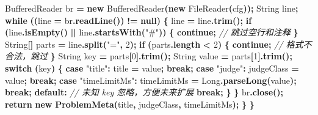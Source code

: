 \documentclass[
  11pt,
]{ctexart}
\newenvironment{Shaded}{\begin{snugshade}}{\end{snugshade}}
\newcommand{\BuiltInTok}[1]{#1}
\newcommand{\CommentTok}[1]{\textcolor[rgb]{0.56,0.35,0.01}{\textit{#1}}}
\newcommand{\ControlFlowTok}[1]{\textcolor[rgb]{0.13,0.29,0.53}{\textbf{#1}}}
\newcommand{\DecValTok}[1]{\textcolor[rgb]{0.00,0.00,0.81}{#1}}
\newcommand{\FunctionTok}[1]{\textcolor[rgb]{0.13,0.29,0.53}{\textbf{#1}}}
\newcommand{\KeywordTok}[1]{\textcolor[rgb]{0.13,0.29,0.53}{\textbf{#1}}}
\newcommand{\NormalTok}[1]{#1}
\newcommand{\OperatorTok}[1]{\textcolor[rgb]{0.81,0.36,0.00}{\textbf{#1}}}
\newcommand{\StringTok}[1]{\textcolor[rgb]{0.31,0.60,0.02}{#1}}
\begin{document}
\begin{Shaded}
\begin{Highlighting}[]
        \BuiltInTok{BufferedReader}\NormalTok{ br }\OperatorTok{=} \KeywordTok{new} \BuiltInTok{BufferedReader}\OperatorTok{(}\KeywordTok{new} \BuiltInTok{FileReader}\OperatorTok{(}\NormalTok{cfg}\OperatorTok{));}
        \BuiltInTok{String}\NormalTok{ line}\OperatorTok{;}
        \ControlFlowTok{while} \OperatorTok{((}\NormalTok{line }\OperatorTok{=}\NormalTok{ br}\OperatorTok{.}\FunctionTok{readLine}\OperatorTok{())} \OperatorTok{!=} \KeywordTok{null}\OperatorTok{)} \OperatorTok{\{}
\NormalTok{            line }\OperatorTok{=}\NormalTok{ line}\OperatorTok{.}\FunctionTok{trim}\OperatorTok{();}
            \ControlFlowTok{if} \OperatorTok{(}\NormalTok{line}\OperatorTok{.}\FunctionTok{isEmpty}\OperatorTok{()} \OperatorTok{||}\NormalTok{ line}\OperatorTok{.}\FunctionTok{startsWith}\OperatorTok{(}\StringTok{"\#"}\OperatorTok{))} \OperatorTok{\{}
                \ControlFlowTok{continue}\OperatorTok{;}   \CommentTok{// 跳过空行和注释}
            \OperatorTok{\}}
            \BuiltInTok{String}\OperatorTok{[]}\NormalTok{ parts }\OperatorTok{=}\NormalTok{ line}\OperatorTok{.}\FunctionTok{split}\OperatorTok{(}\StringTok{"="}\OperatorTok{,} \DecValTok{2}\OperatorTok{);}
            \ControlFlowTok{if} \OperatorTok{(}\NormalTok{parts}\OperatorTok{.}\FunctionTok{length} \OperatorTok{\textless{}} \DecValTok{2}\OperatorTok{)} \OperatorTok{\{}
                \ControlFlowTok{continue}\OperatorTok{;}   \CommentTok{// 格式不合法，跳过}
            \OperatorTok{\}}
            \BuiltInTok{String}\NormalTok{ key   }\OperatorTok{=}\NormalTok{ parts}\OperatorTok{[}\DecValTok{0}\OperatorTok{].}\FunctionTok{trim}\OperatorTok{();}
            \BuiltInTok{String}\NormalTok{ value }\OperatorTok{=}\NormalTok{ parts}\OperatorTok{[}\DecValTok{1}\OperatorTok{].}\FunctionTok{trim}\OperatorTok{();}
            \ControlFlowTok{switch} \OperatorTok{(}\NormalTok{key}\OperatorTok{)} \OperatorTok{\{}
                \ControlFlowTok{case} \StringTok{"title"}\OperatorTok{:}
\NormalTok{                    title }\OperatorTok{=}\NormalTok{ value}\OperatorTok{;}
                    \ControlFlowTok{break}\OperatorTok{;}
                \ControlFlowTok{case} \StringTok{"judge"}\OperatorTok{:}
\NormalTok{                    judgeClass }\OperatorTok{=}\NormalTok{ value}\OperatorTok{;}
                    \ControlFlowTok{break}\OperatorTok{;}
                \ControlFlowTok{case} \StringTok{"timeLimitMs"}\OperatorTok{:}
\NormalTok{                    timeLimitMs }\OperatorTok{=} \BuiltInTok{Long}\OperatorTok{.}\FunctionTok{parseLong}\OperatorTok{(}\NormalTok{value}\OperatorTok{);}
                    \ControlFlowTok{break}\OperatorTok{;}
                \KeywordTok{default}\OperatorTok{:}
                    \CommentTok{// 未知 key 忽略，方便未来扩展}
                    \ControlFlowTok{break}\OperatorTok{;}
            \OperatorTok{\}}
        \OperatorTok{\}}
\NormalTok{        br}\OperatorTok{.}\FunctionTok{close}\OperatorTok{();}
        \ControlFlowTok{return} \KeywordTok{new} \FunctionTok{ProblemMeta}\OperatorTok{(}\NormalTok{title}\OperatorTok{,}\NormalTok{ judgeClass}\OperatorTok{,}\NormalTok{ timeLimitMs}\OperatorTok{);}
    \OperatorTok{\}}
\OperatorTok{\}}
\end{Highlighting}
\end{Shaded}
\end{document}

